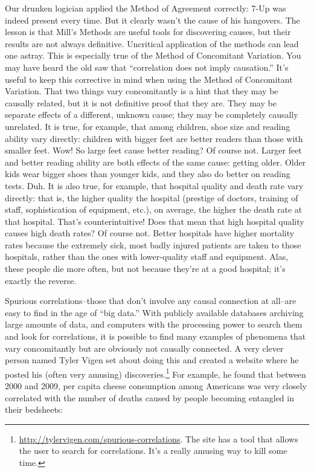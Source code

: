 Our drunken logician applied the Method of Agreement correctly: 7-Up was indeed present every
time. But it clearly wasn't the cause of his hangovers. The lesson is that Mill's Methods are useful
tools for discovering causes, but their results are not always definitive. Uncritical application of
the methods can lead one astray. This is especially true of the Method of Concomitant Variation.
You may have heard the old saw that ``correlation does not imply causation.'' It's useful to keep
this corrective in mind when using the Method of Concomitant Variation. That two things vary
concomitantly is a hint that they may be causally related, but it is not definitive proof that they are.
They may be separate effects of a different, unknown cause; they may be completely causally
unrelated. It is true, for example, that among children, shoe size and reading ability vary directly:
children with bigger feet are better readers than those with smaller feet. Wow! So large feet cause
better reading? Of course not. Larger feet and better reading ability are both effects of the same
cause: getting older. Older kids wear bigger shoes than younger kids, and they also do better on
reading tests. Duh. It is also true, for example, that hospital quality and death rate vary directly:
that is, the higher quality the hospital (prestige of doctors, training of staff, sophistication of
equipment, etc.), on average, the higher the death rate at that hospital. That's counterintuitive!
Does that mean that high hospital quality causes high death rates? Of course not. Better hospitals
have higher mortality rates because the extremely sick, most badly injured patients are taken to
those hospitals, rather than the ones with lower-quality staff and equipment. Alas, these people die
more often, but not because they're at a good hospital; it's exactly the reverse.

Spurious correlations--those that don't involve any causal connection at all--are easy to find in
the age of ``big data.'' With publicly available databases archiving large amounts of data, and
computers with the processing power to search them and look for correlations, it is possible to find
many examples of phenomena that vary concomitantly but are obviously not causally connected.
A very clever person named Tyler Vigen set about doing this and created a website where he
posted his (often very amusing) 
discoveries.\footnote{\url{http://tylervigen.com/spurious-correlations}. 
The site has a tool that allows the user to search for correlations. It's a
really amusing way to kill some time.} 
For example, he found that between 2000 and 2009,
per capita cheese consumption among Americans was very closely correlated with the number of
deaths caused by people becoming entangled in their bedsheets:

